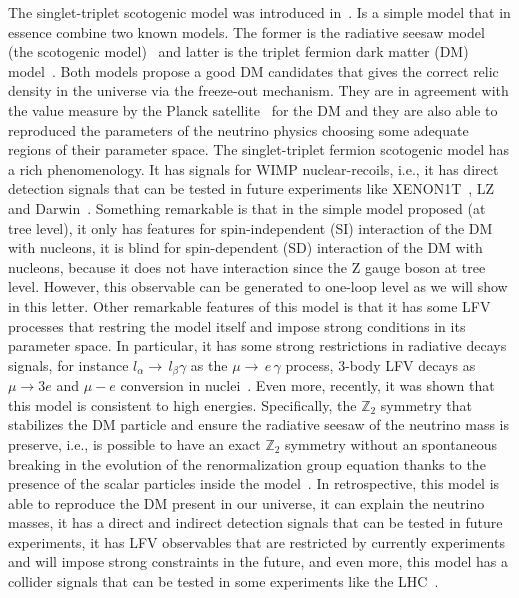\documentclass[12pt,letterpaper]{article}
\begin{document}
The singlet-triplet scotogenic model was introduced in~\cite{Hirsch:2013ola}.
Is a simple model that in essence combine two known models. The former is the radiative seesaw model (the scotogenic model)~\cite{Ma:2006km} and latter is the triplet fermion dark matter (DM) model~\cite{Ma:2008cu}. Both models propose a good DM candidates that gives the correct relic density in the universe via the freeze-out mechanism. They are in agreement with the value measure by the Planck satellite~\cite{Aghanim:2018eyx} for the DM  and they are also able to reproduced the parameters of the neutrino physics choosing some adequate regions of their parameter space. 
The singlet-triplet fermion scotogenic model has a rich phenomenology. 
It has signals for WIMP nuclear-recoils, i.e., it has direct detection signals that can be tested in future experiments like XENON1T~\cite{Aprile:2018dbl}, LZ~\cite{Mount:2017qzi} and Darwin~\cite{Aalbers:2016jon}. Something remarkable is that in the simple model proposed (at tree level), it only has features for spin-independent (SI) interaction of the DM with nucleons, it is blind for spin-dependent (SD) interaction of the DM with nucleons, because it does not have interaction since the Z gauge boson at tree level. However, this observable can be generated to one-loop level as we will show in this letter.
Other remarkable features of this model is that it has some LFV processes that restring the model itself and impose strong conditions in its parameter space. In particular, it has some strong restrictions in radiative decays signals, for instance $l_{\alpha}\to\,l_{\beta}\gamma$ as the $\mu\to\,e\,\gamma$ process, 3-body LFV decays as $\mu\to 3 e$ and $\mu - e$ conversion in nuclei~\cite{Rocha-Moran:2016enp}.  
Even more, recently, it was shown that this model is consistent to high energies. Specifically, the $\mathbb{Z}_2$ symmetry that stabilizes the DM particle and ensure the radiative seesaw of the neutrino mass is preserve, i.e., is possible to have an exact $\mathbb{Z}_2$ symmetry without an spontaneous breaking in the evolution of the renormalization group equation thanks to the presence of the scalar particles inside the model~\cite{Merle:2016scw}.
In retrospective, this model is able to reproduce the DM present in our universe, it can explain the neutrino masses, it has a direct and indirect detection signals that can be tested in future experiments, it has LFV observables that are restricted by currently experiments and will impose strong constraints in the future, and even more, this model has a collider signals that can be tested in some experiments like the LHC~\cite{Choubey:2017yyn}. 
\end{document}
